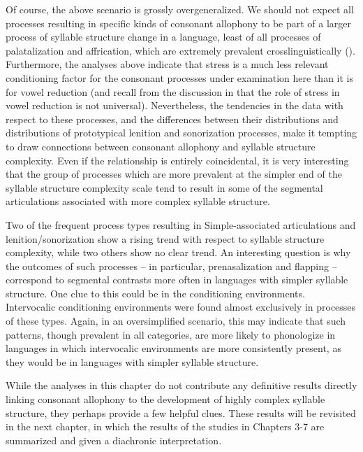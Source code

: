   Of course, the above scenario is grossly overgeneralized. We should not expect all processes resulting in specific kinds of consonant allophony to be part of a larger process of syllable structure change in a language, least of all processes of palatalization and affrication, which are extremely prevalent crosslinguistically (\citealt{Bhat1978,Bateman2007}). Furthermore, the analyses above indicate that stress is a much less relevant conditioning factor for the consonant processes under examination here than it is for vowel reduction (and recall from the discussion in  that the role of stress in vowel reduction is not universal). Nevertheless, the tendencies in the data with respect to these processes, and the differences between their distributions and distributions of prototypical lenition and sonorization processes, make it tempting to draw connections between consonant allophony and syllable structure complexity. Even if the relationship is entirely coincidental, it is very interesting that the group of processes which are more prevalent at the simpler end of the syllable structure complexity scale tend to result in some of the segmental articulations associated with more complex syllable structure.

  Two of the frequent process types resulting in Simple-associated articulations and lenition/sonorization show a rising trend with respect to syllable structure complexity, while two others show no clear trend. An interesting question is why the outcomes of such processes -- in particular, prenasalization and flapping -- correspond to segmental contrasts more often in languages with simpler syllable structure. One clue to this could be in the conditioning environments. Intervocalic conditioning environments were found almost exclusively in processes of these types. Again, in an oversimplified scenario, this may indicate that such patterns, though prevalent in all categories, are more likely to phonologize in languages in which intervocalic environments are more consistently present, as they would be in languages with simpler syllable structure.

  While the analyses in this chapter do not contribute any definitive results directly linking consonant allophony to the development of highly complex syllable structure, they perhaps provide a few helpful clues. These results will be revisited in the next chapter, in which the results of the studies in Chapters 3-7 are summarized and given a diachronic interpretation.

